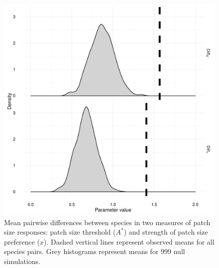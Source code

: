 \begin{figure}[htbp]
\centering
\includegraphics[width=5.5in]{figures/overall_null.pdf}
\caption{Mean pairwise
differences between species in two measures of patch size responses:
patch size threshold (\(A^{*}\)) and strength of patch size preference
(\(x\)). Dashed vertical lines represent observed means for all species
pairs. Grey histograms represent means for 999 null simulations.}
\end{figure}

